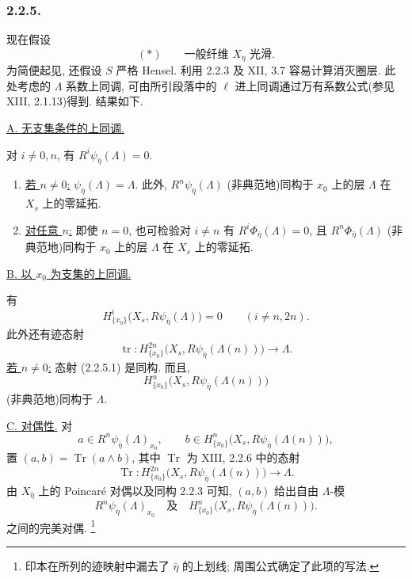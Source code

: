 \subsubsection*{2.2.5.}
现在假设
\[
(*)\qquad\text{一般纤维 $X_\eta$ 光滑.}
\]
为简便起见, 还假设 $S$ 严格 Hensel. 利用 2.2.3 及 XII, 3.7 容易计算消灭圈层. 此处考虑的 $\Lambda$ 系数上同调, 可由所引段落中的 $\ell$ 进上同调通过万有系数公式(参见 XIII, 2.1.13)得到. 结果如下.

\medskip
\noindent\underline{A. 无支集条件的上同调.}

对 $i\ne0,n$, 有 $R^i\psi_{\bar\eta}(\Lambda)=0$.

\begin{enumerate}
\item[1)] \underline{若 $n\ne0$:}
$\psi_{\bar\eta}(\Lambda)=\Lambda$. 此外, $R^n\psi_{\bar\eta}(\Lambda)$ (非典范地)同构于 $x_0$ 上的层 $\Lambda$ 在 $X_s$ 上的零延拓.

\item[2)] \underline{对任意 $n$:}
即使 $n=0$, 也可检验对 $i\ne n$ 有 $R^i\Phi_{\bar\eta}(\Lambda)=0$, 且 $R^n\Phi_{\bar\eta}(\Lambda)$ (非典范地)同构于 $x_0$ 上的层 $\Lambda$ 在 $X_s$ 上的零延拓.
\end{enumerate}

\medskip
\noindent\underline{B. 以 $x_0$ 为支集的上同调.}

有
\[
H^i_{\{x_0\}}\bigl(X_s,R\psi_{\bar\eta}(\Lambda)\bigr)=0
\qquad(i\ne n,2n).
\]
此外还有迹态射
\begin{equation}\tag{2.2.5.1}
\operatorname{tr}:
H^{2n}_{\{x_0\}}\bigl(X_s,R\psi_{\bar\eta}(\Lambda(n))\bigr)
\longrightarrow\Lambda.
\end{equation}
\underline{若 $n\ne0$:} 态射 (2.2.5.1) 是同构. 而且,
\[
H^n_{\{x_0\}}\bigl(X_s,R\psi_{\bar\eta}(\Lambda(n))\bigr)
\]
(非典范地)同构于 $\Lambda$.

\medskip
\noindent\underline{C. 对偶性.}
对
\[
a\in R^n\psi_{\bar\eta}(\Lambda)_{x_0},
\qquad
b\in H^n_{\{x_0\}}\bigl(X_s,R\psi_{\bar\eta}(\Lambda(n))\bigr),
\]
置 $(a,b)=\operatorname{Tr}(a\wedge b)$, 其中 $\operatorname{Tr}$ 为 XIII, 2.2.6 中的态射
\[
\operatorname{Tr}:
H^{2n}_{\{x_0\}}\bigl(X_s,R\psi_{\bar\eta}(\Lambda(n))\bigr)
\longrightarrow\Lambda.
\]
由 $X_{\bar\eta}$ 上的 Poincar\'e 对偶以及同构 2.2.3 可知, $(a,b)$ 给出自由 $\Lambda$-模
\[
R^n\psi_{\bar\eta}(\Lambda)_{x_0}
\quad\text{及}\quad
H^n_{\{x_0\}}\bigl(X_s,R\psi_{\bar\eta}(\Lambda(n))\bigr).
\]
之间的完美对偶.
\footnote{印本在所列的迹映射中漏去了 $\bar\eta$ 的上划线; 周围公式确定了此项的写法.}